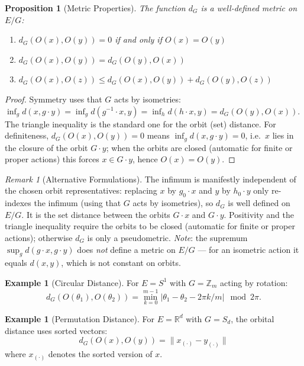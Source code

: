 \documentclass[11pt,twoside,openright]{book}
\theoremstyle{plain}
\newtheorem{proposition}[theorem]{Proposition}
\theoremstyle{definition}
\newtheorem{example}[theorem]{Example}
\theoremstyle{remark}
\newtheorem{remark}[theorem]{Remark}
\newcommand{\Rd}{\mathbb{R}}
\newcommand{\Zd}{\mathbb{Z}}
\newcommand{\norm}[1]{\|#1\|}
\begin{document}
\begin{proposition}[Metric Properties]
\label{prop:twin-metric}
The function $d_G$ is a well-defined metric on $E/G$:
\begin{enumerate}[label=(\roman*)]
\item $d_G(O(x), O(y)) = 0$ if and only if $O(x) = O(y)$
\item $d_G(O(x), O(y)) = d_G(O(y), O(x))$
\item $d_G(O(x), O(z)) \leq d_G(O(x), O(y)) + d_G(O(y), O(z))$
\end{enumerate}
\end{proposition}

\begin{proof}
Symmetry uses that $G$ acts by isometries: $\inf_g d(x, g\cdot y) = \inf_g d(g^{-1}\cdot x, y) = \inf_h d(h\cdot x, y) = d_G(O(y),O(x))$. The triangle inequality is the standard one for the orbit (set) distance. For definiteness, $d_G(O(x),O(y))=0$ means $\inf_g d(x, g\cdot y)=0$, i.e.\ $x$ lies in the closure of the orbit $G\cdot y$; when the orbits are closed (automatic for finite or proper actions) this forces $x\in G\cdot y$, hence $O(x)=O(y)$.
\end{proof}

\begin{remark}[Alternative Formulations]
The infimum is manifestly independent of the chosen orbit representatives: replacing $x$ by $g_0\cdot x$ and $y$ by $h_0\cdot y$ only re-indexes the infimum (using that $G$ acts by isometries), so $d_G$ is well defined on $E/G$. It is the set distance between the orbits $G\cdot x$ and $G\cdot y$. Positivity and the triangle inequality require the orbits to be closed (automatic for finite or proper actions); otherwise $d_G$ is only a pseudometric. \emph{Note}: the supremum $\sup_g d(g\cdot x,g\cdot y)$ does \emph{not} define a metric on $E/G$ --- for an isometric action it equals $d(x,y)$, which is not constant on orbits.
\end{remark}

\begin{example}[Circular Distance]
For $E = S^1$ with $G = \Zd_m$ acting by rotation:
\[
d_G(O(\theta_1), O(\theta_2)) = \min_{k=0}^{m-1} |\theta_1 - \theta_2 - 2\pi k/m| \mod 2\pi.
\]
\end{example}

\begin{example}[Permutation Distance]
For $E = \Rd^d$ with $G = S_d$, the orbital distance uses sorted vectors:
\[
d_G(O(x), O(y)) = \norm{x_{(\cdot)} - y_{(\cdot)}}
\]
where $x_{(\cdot)}$ denotes the sorted version of $x$.
\end{example}
\end{document}
